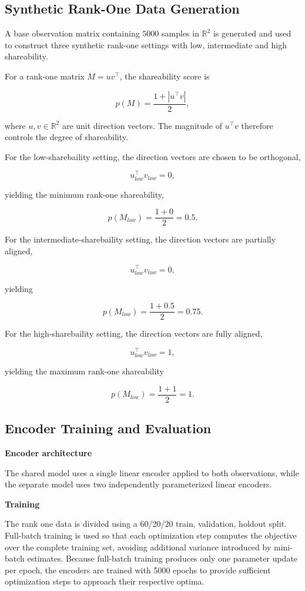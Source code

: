 \documentclass{article}
\begin{document}
\subsection{Synthetic Rank-One Data Generation}

A base observation matrix containing \(5000\) samples in \(\mathbb{R}^2\) is generated and used to construct three synthetic rank-one settings with low, intermediate and high shareability.

For a rank-one matrix \(M = u v^\top\), the shareability score is

\[
p(M) = \frac{1 + |u^\top v|}{2},
\]

where \(u,v \in \mathbb{R}^2\) are unit direction vectors. The magnitude of \(u^\top v\) therefore controls the degree of shareability.

For the low-sharebaility setting, the direction vectors are chosen to be orthogonal,

\[
u_{low}^\top v_{low} = 0,
\]

yielding the minimum rank-one shareability,

\[
p(M_{low}) = \frac{1 + 0}{2} = 0.5.
\]

For the intermediate-sharebaility setting, the direction vectors are partially aligned,

\[
u_{low}^\top v_{low} = 0,
\]

yielding

\[
p(M_{low}) = \frac{1 + 0.5}{2} = 0.75.
\]

For the high-sharebaility setting, the direction vectors are fully aligned,

\[
u_{low}^\top v_{low} = 1,
\]

yielding the maximum rank-one shareability

\[
p(M_{low}) = \frac{1 + 1}{2} = 1.
\]

\subsection{Encoder Training and Evaluation}

\textbf{Encoder architecture}

The shared model uses a single linear encoder applied to both observations, while the separate model uses two independently parameterized linear encoders. 

\textbf{Training}

The rank one data is divided using a 60/20/20 train, validation, holdout split. Full-batch training is used so that each optimization step computes the objective over the complete training set, avoiding additional variance introduced by mini-batch estimates. Because full-batch training produces only one parameter update per epoch, the encoders are trained with 5000 epochs to provide sufficient optimization steps to approach their respective optima. 
\end{document}
